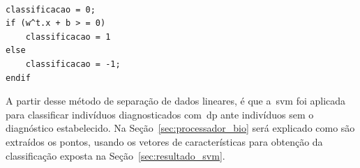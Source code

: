 \begin{lstlisting}[frame=single, caption=Código de Predição da Classes, label=codepredicaoclasse]  % Start your code-block

classificacao = 0;
if (w^t.x + b > = 0)
	classificacao = 1
else
	classificacao = -1;
endif
\end{lstlisting}

A partir desse método de separação de dados lineares, é que a~\ac{svm} foi aplicada para classificar indivíduos diagnosticados com~\ac{dp} ante indivíduos sem o diagnóstico estabelecido. Na Seção~\ref{sec:processador_bio} será explicado como são extraídos os pontos, usando os vetores de características para obtenção da classificação exposta na Seção~\ref{sec:resultado_svm}.

